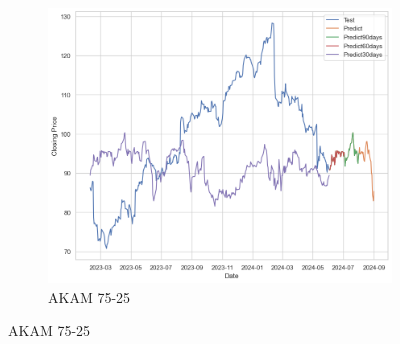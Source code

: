 \documentclass{ieeeojies}
\begin{document}
\begin{figure}[H]
    \hfill
    \begin{subfigure}[b]{0.33\linewidth}
        \centering
        \includegraphics[width=\linewidth]{ETS Plot/AKAM_ETS_75_25.png}
        \caption{AKAM 75-25}
        \label{fig:akam-75-25}
    \end{subfigure}
\end{figure}
 \vspace{-10pt}
\end{document}
